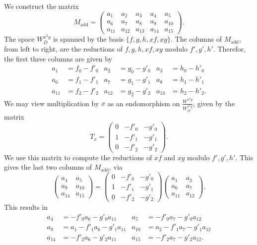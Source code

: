 We construct the matrix 
\[ M_{\text{add}} =
\begin{pmatrix}
  a_1 & a_2 & a_3 & a_4 & a_5 \\
  a_6 & a_7 & a_8 & a_9 & a_{10} \\
  a_{11} & a_{12} & a_{13} & a_{14} & a_{15}
\end{pmatrix}. \]
The space $W_D^{x^2y}$ is spanned by the basis $\{f,g,h,xf,xg\}$.
The columns of $M_{\text{add}}$, from left to right, are the reductions of $f,g,h,xf,xg$ modulo $f',g',h'$.
Therefor, the first three columns are given by
\begin{align*}
  a_1    &= f_0 - f'_0 & a_2    &= g_0 - g'_0 & a_3    &= h_0 - h'_0 \\
  a_6    &= f_1 - f'_1 & a_7    &= g_1 - g'_1 & a_8    &= h_1 - h'_1 \\
  a_{11} &= f_2 - f'_2 & a_{12} &= g_2 - g'_2 & a_{13} &= h_2 - h'_2.
\end{align*}
We may view multiplication by $x$ as an endomorphism on $\frac {W^{x^2y}}{W_{D'}^{x^2y}}$, given by the matrix
\[ T_x = \begin{pmatrix}
    0 & -f'_0 & -g'_0 \\
    1 & -f'_1 & -g'_1 \\
    0 & -f'_2 & -g'_2
  \end{pmatrix}. \]
We use this matrix to compute the reductions of $xf$ and $xg$ modulo $f',g',h'$.
This gives the last two columns of $M_{\text{add}}$, via
\[ 
  \begin{pmatrix}
    a_4    & a_5    \\
    a_9    & a_{10} \\
    a_{14} & a_{15}
  \end{pmatrix} = 
  \begin{pmatrix}
    0 & -f'_0 & -g'_0 \\
    1 & -f'_1 & -g'_1 \\
    0 & -f'_2 & -g'_2
  \end{pmatrix}
  \begin{pmatrix}
    a_1    & a_2    \\
    a_6    & a_7    \\
    a_{11} & a_{12}
  \end{pmatrix}.
\]
This results in
\begin{align*}
  a_4    &=     - f'_0a_6 - g'_0a_{11} & a_5    &=     - f'_0a_7 - g'_0a_{12} \\
  a_9    &= a_1 - f'_1a_6 - g'_1a_{11} & a_{10} &= a_2 - f'_1a_7 - g'_1a_{12} \\
  a_{14} &=     - f'_2a_6 - g'_2a_{11} & a_{15} &=     - f'_2a_7 - g'_2a_{12}.
\end{align*}

